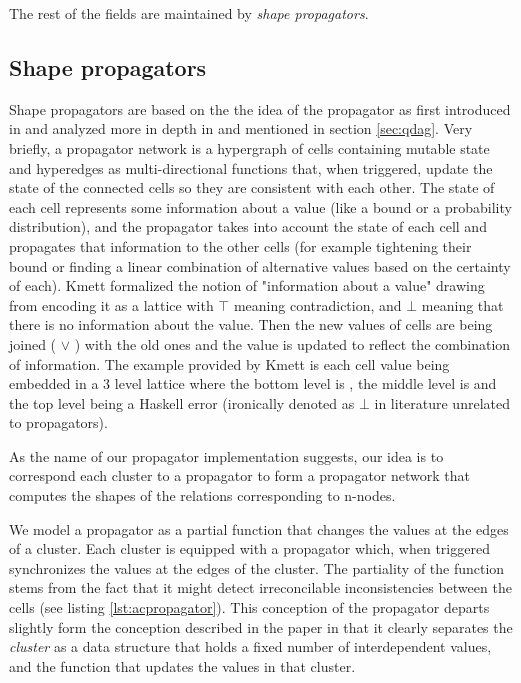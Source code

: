 The rest of the fields are maintained by \emph{shape propagators}.

\subsection{Shape propagators}
\label{sec:shape_propagators}

Shape propagators are based on the the idea of the propagator as first
introduced in \cite{sussmanArtPropagator2009} and analyzed more in
depth in \cite{hansonSoftwareDesignFlexibility2021a} and mentioned in
section \ref{sec:qdag}. Very briefly, a propagator network is a
hypergraph of cells containing mutable state and hyperedges as
multi-directional functions that, when triggered, update the state of
the connected cells so they are consistent with each other. The state
of each cell represents some information about a value (like a bound
or a probability distribution), and the propagator takes into account
the state of each cell and propagates that information to the other
cells (for example tightening their bound or finding a linear
combination of alternative values based on the certainty of
each). Kmett \cite{kmettPropagators2021} formalized the notion of
"information about a value" drawing from
\cite{kuperLVarsLatticebasedData2013} encoding it as a lattice with
\(\top\) meaning contradiction, and \(\bot\) meaning that there is no
information about the value. Then the new values of cells are being
joined ( \(\lor\) ) with the old ones and the value is updated to
reflect the combination of information. The example provided by Kmett
is each cell value being embedded in a 3 level lattice where the
bottom level is , the middle level is  and
the top level being a Haskell error (ironically denoted as \(\bot\) in
literature unrelated to propagators).

As the name of our propagator implementation suggests, our idea is to
correspond each cluster to a propagator to form a propagator network
that computes the shapes of the relations corresponding to n-nodes.

We model a propagator as a partial function that changes
the values at the edges of a cluster. Each cluster is equipped with a
propagator which, when triggered synchronizes the values at the edges
of the cluster. The partiality of the function stems from the fact
that it might detect irreconcilable inconsistencies between the cells
(see listing \ref{lst:acpropagator}). This conception of the
propagator departs slightly form the conception described in the paper
in that it clearly separates the \emph{cluster} as a data structure
that holds a fixed number of interdependent values, and the function
that updates the values in that cluster.

